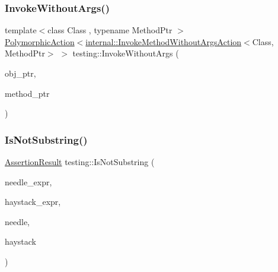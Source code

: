 \subsubsection{\texorpdfstring{Invoke\+Without\+Args()}{InvokeWithoutArgs()}\hspace{0.1cm}{\footnotesize\ttfamily [2/2]}}
{\footnotesize\ttfamily template$<$class Class , typename Method\+Ptr $>$ \\
\hyperlink{classtesting_1_1_polymorphic_action}{Polymorphic\+Action}$<$\hyperlink{classtesting_1_1internal_1_1_invoke_method_without_args_action}{internal\+::\+Invoke\+Method\+Without\+Args\+Action}$<$Class, Method\+Ptr$>$ $>$ testing\+::\+Invoke\+Without\+Args (\begin{DoxyParamCaption}\item[{Class $\ast$}]{obj\+\_\+ptr,  }\item[{Method\+Ptr}]{method\+\_\+ptr }\end{DoxyParamCaption})}

\mbox{\label{namespacetesting_a2288dcf4249f88af67dcd46544dc49a6}} 
\subsubsection{\texorpdfstring{Is\+Not\+Substring()}{IsNotSubstring()}\hspace{0.1cm}{\footnotesize\ttfamily [1/3]}}
{\footnotesize\ttfamily \hyperlink{classtesting_1_1_assertion_result}{Assertion\+Result} testing\+::\+Is\+Not\+Substring (\begin{DoxyParamCaption}\item[{const char $\ast$}]{needle\+\_\+expr,  }\item[{const char $\ast$}]{haystack\+\_\+expr,  }\item[{const char $\ast$}]{needle,  }\item[{const char $\ast$}]{haystack }\end{DoxyParamCaption})}

\mbox{\label{namespacetesting_a53e5c6e91ea429c43de7f4f57e33d166}} 
